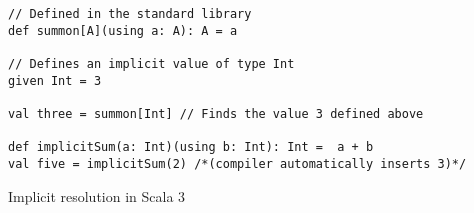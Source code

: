 \begin{algorithm}
\begin{verbatim}
// Defined in the standard library
def summon[A](using a: A): A = a

// Defines an implicit value of type Int
given Int = 3

val three = summon[Int] // Finds the value 3 defined above

def implicitSum(a: Int)(using b: Int): Int =  a + b
val five = implicitSum(2) /*(compiler automatically inserts 3)*/
\end{verbatim}

\caption{Implicit resolution in Scala 3 \label{scala:implicits}}
\end{algorithm}